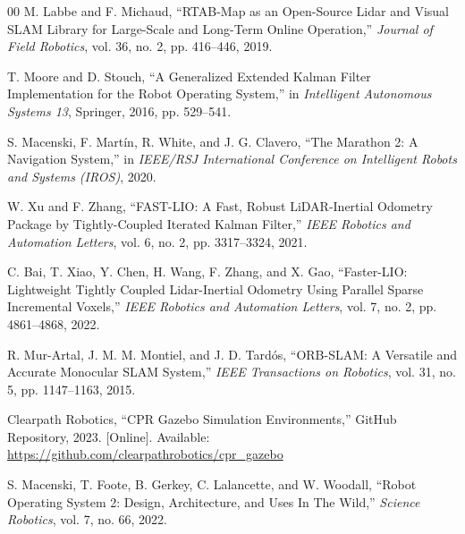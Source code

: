 \documentclass[conference]{IEEEtran}
\begin{document}
\begin{thebibliography}{00}
 M. Labbe and F. Michaud, ``RTAB-Map as an Open-Source Lidar and Visual SLAM Library for Large-Scale and Long-Term Online Operation,'' \textit{Journal of Field Robotics}, vol. 36, no. 2, pp. 416--446, 2019.

 T. Moore and D. Stouch, ``A Generalized Extended Kalman Filter Implementation for the Robot Operating System,'' in \textit{Intelligent Autonomous Systems 13}, Springer, 2016, pp. 529--541.

 S. Macenski, F. Martín, R. White, and J. G. Clavero, ``The Marathon 2: A Navigation System,'' in \textit{IEEE/RSJ International Conference on Intelligent Robots and Systems (IROS)}, 2020.

 W. Xu and F. Zhang, ``FAST-LIO: A Fast, Robust LiDAR-Inertial Odometry Package by Tightly-Coupled Iterated Kalman Filter,'' \textit{IEEE Robotics and Automation Letters}, vol. 6, no. 2, pp. 3317--3324, 2021.

 C. Bai, T. Xiao, Y. Chen, H. Wang, F. Zhang, and X. Gao, ``Faster-LIO: Lightweight Tightly Coupled Lidar-Inertial Odometry Using Parallel Sparse Incremental Voxels,'' \textit{IEEE Robotics and Automation Letters}, vol. 7, no. 2, pp. 4861--4868, 2022.

 R. Mur-Artal, J. M. M. Montiel, and J. D. Tardós, ``ORB-SLAM: A Versatile and Accurate Monocular SLAM System,'' \textit{IEEE Transactions on Robotics}, vol. 31, no. 5, pp. 1147--1163, 2015.

 Clearpath Robotics, ``CPR Gazebo Simulation Environments,'' GitHub Repository, 2023. [Online]. Available: \url{https://github.com/clearpathrobotics/cpr_gazebo}

 S. Macenski, T. Foote, B. Gerkey, C. Lalancette, and W. Woodall, ``Robot Operating System 2: Design, Architecture, and Uses In The Wild,'' \textit{Science Robotics}, vol. 7, no. 66, 2022.
\end{thebibliography}
\end{document}

